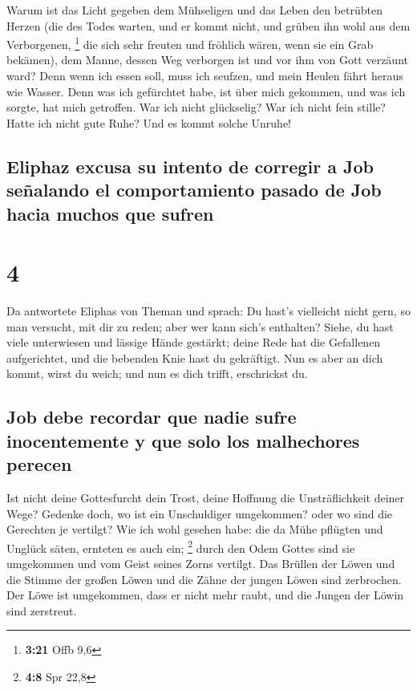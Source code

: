  Warum ist das Licht gegeben dem Mühseligen und das Leben
den betrübten Herzen  (die des Todes warten, und er kommt
nicht, und grüben ihn wohl aus dem Verborgenen, \footnote{\textbf{3:21}
  Offb 9,6}  die sich sehr freuten und fröhlich wären,
wenn sie ein Grab bekämen),  dem Manne, dessen Weg
verborgen ist und vor ihm von Gott verzäunt ward?  Denn
wenn ich essen soll, muss ich seufzen, und mein Heulen fährt heraus wie
Wasser.  Denn was ich gefürchtet habe, ist über mich
gekommen, und was ich sorgte, hat mich getroffen.  War
ich nicht glückselig? War ich nicht fein stille? Hatte ich nicht gute
Ruhe? Und es kommt solche Unruhe!

\hypertarget{eliphaz-excusa-su-intento-de-corregir-a-job-seuxf1alando-el-comportamiento-pasado-de-job-hacia-muchos-que-sufren}{%
\subsection{Eliphaz excusa su intento de corregir a Job señalando el
comportamiento pasado de Job hacia muchos que
sufren}\label{eliphaz-excusa-su-intento-de-corregir-a-job-seuxf1alando-el-comportamiento-pasado-de-job-hacia-muchos-que-sufren}}

\hypertarget{section-3}{%
\section{4}\label{section-3}}

 Da antwortete Eliphas von Theman und sprach:
 Du hast's vielleicht nicht gern, so man versucht, mit dir
zu reden; aber wer kann sich's enthalten?  Siehe, du hast
viele unterwiesen und lässige Hände gestärkt;  deine Rede
hat die Gefallenen aufgerichtet, und die bebenden Knie hast du
gekräftigt.  Nun es aber an dich kommt, wirst du weich;
und nun es dich trifft, erschrickst du.

\hypertarget{job-debe-recordar-que-nadie-sufre-inocentemente-y-que-solo-los-malhechores-perecen}{%
\subsection{Job debe recordar que nadie sufre inocentemente y que solo
los malhechores
perecen}\label{job-debe-recordar-que-nadie-sufre-inocentemente-y-que-solo-los-malhechores-perecen}}

 Ist nicht deine Gottesfurcht dein Trost, deine Hoffnung
die Unsträflichkeit deiner Wege?  Gedenke doch, wo ist ein
Unschuldiger umgekommen? oder wo sind die Gerechten je vertilgt?
 Wie ich wohl gesehen habe: die da Mühe pflügten und
Unglück säten, ernteten es auch ein; \footnote{\textbf{4:8} Spr 22,8}
 durch den Odem Gottes sind sie umgekommen und vom Geist
seines Zorns vertilgt.  Das Brüllen der Löwen und die
Stimme der großen Löwen und die Zähne der jungen Löwen sind zerbrochen.
 Der Löwe ist umgekommen, dass er nicht mehr raubt, und
die Jungen der Löwin sind zerstreut.

